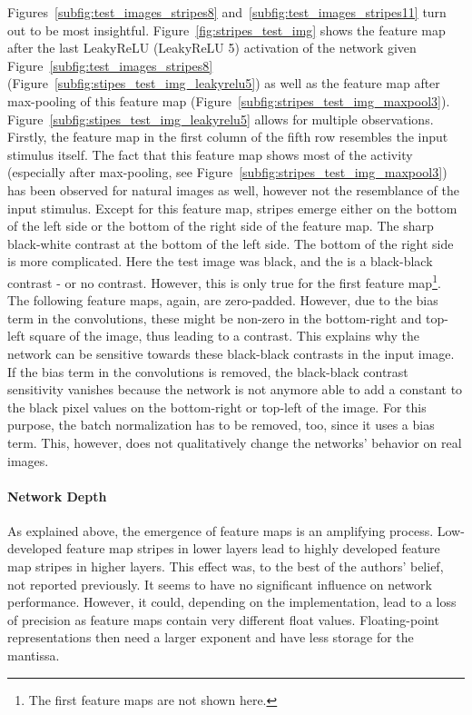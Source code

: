 Figures~\ref{subfig:test_images_stripes8} and~\ref{subfig:test_images_stripes11} turn out to be most insightful.
Figure~\ref{fig:stripes_test_img} shows the feature map after the last LeakyReLU (LeakyReLU 5) activation of the network given Figure~\ref{subfig:test_images_stripes8} (Figure~\ref{subfig:stipes_test_img_leakyrelu5}) as well as the feature map after max-pooling of this feature map (Figure~\ref{subfig:stripes_test_img_maxpool3}).
Figure~\ref{subfig:stipes_test_img_leakyrelu5} allows for multiple observations.
Firstly, the feature map in the first column of the fifth row resembles the input stimulus itself.
The fact that this feature map shows most of the activity (especially after max-pooling, see Figure~\ref{subfig:stripes_test_img_maxpool3}) has been observed for natural images as well, however not the resemblance of the input stimulus.
Except for this feature map, stripes emerge either on the bottom of the left side or the bottom of the right side of the feature map.
The sharp black-white contrast at the bottom of the left side.
The bottom of the right side is more complicated.
Here the test image was black, and the  is a black-black contrast - or no contrast.
However, this is only true for the first feature map\footnote{The first feature maps are not shown here.}.
The following feature maps, again, are zero-padded.
However, due to the bias term in the convolutions, these might be non-zero in the bottom-right and top-left square of the image, thus leading to a contrast.
This explains why the network can be sensitive towards these black-black contrasts in the input image.
If the bias term in the convolutions is removed, the black-black contrast sensitivity vanishes because the network is not anymore able to add a constant to the black pixel values on the bottom-right or top-left of the image.
For this purpose, the batch normalization has to be removed, too, since it uses a bias term.
This, however, does not qualitatively change the networks' behavior on real images.

\paragraph{Network Depth}
As explained above, the emergence of feature maps is an amplifying process.
Low-developed feature map stripes in lower layers lead to highly developed feature map stripes in higher layers.
This effect was, to the best of the authors' belief, not reported previously.
It seems to have no significant influence on network performance.
However, it could, depending on the implementation, lead to a loss of precision as feature maps contain very different float values.
Floating-point representations then need a larger exponent and have less storage for the mantissa.

